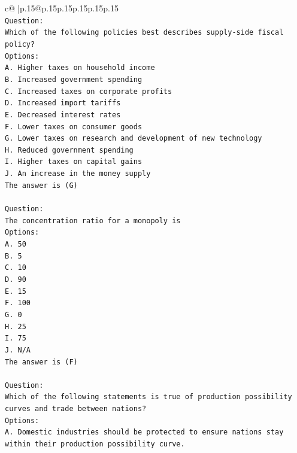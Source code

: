 \documentclass{article}
\begin{document}
{\begin{supertabular}{c@{$\;$}|p{.15\linewidth}@{}p{.15\linewidth}p{.15\linewidth}p{.15\linewidth}p{.15\linewidth}p{.15\linewidth}}
{{{\\ 
\texttt{Question:} \\
\texttt{Which of the following policies best describes supply{-}side fiscal policy?} \\
\texttt{Options:} \\
\texttt{A. Higher taxes on household income} \\
\texttt{B. Increased government spending} \\
\texttt{C. Increased taxes on corporate profits} \\
\texttt{D. Increased import tariffs} \\
\texttt{E. Decreased interest rates} \\
\texttt{F. Lower taxes on consumer goods} \\
\texttt{G. Lower taxes on research and development of new technology} \\
\texttt{H. Reduced government spending} \\
\texttt{I. Higher taxes on capital gains} \\
\texttt{J. An increase in the money supply} \\
\texttt{The answer is (G)} \\
\\ 
\texttt{Question:} \\
\texttt{The concentration ratio for a monopoly is} \\
\texttt{Options:} \\
\texttt{A. 50} \\
\texttt{B. 5} \\
\texttt{C. 10} \\
\texttt{D. 90} \\
\texttt{E. 15} \\
\texttt{F. 100} \\
\texttt{G. 0} \\
\texttt{H. 25} \\
\texttt{I. 75} \\
\texttt{J. N/A} \\
\texttt{The answer is (F)} \\
\\ 
\texttt{Question:} \\
\texttt{Which of the following statements is true of production possibility curves and trade between nations?} \\
\texttt{Options:} \\
\texttt{A. Domestic industries should be protected to ensure nations stay within their production possibility curve.} \\
}}}
\end{supertabular}}
\end{document}
